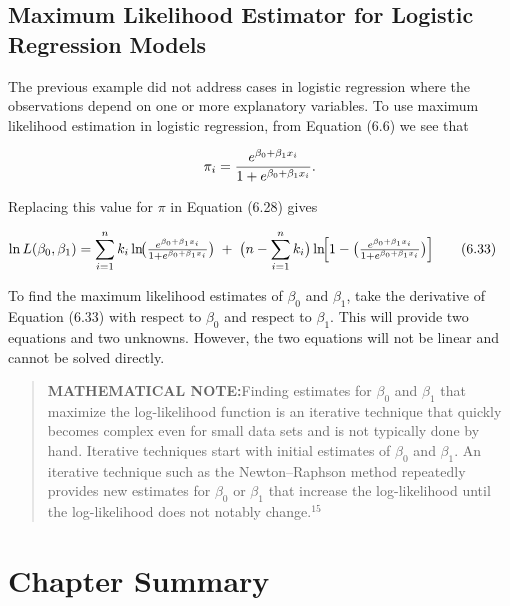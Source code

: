 \documentclass[
]{book}
\begin{document}
\hypertarget{maximum-likelihood-estimator-for-logistic-regression-models}{%
\subsection*{Maximum Likelihood Estimator for Logistic Regression Models}\label{maximum-likelihood-estimator-for-logistic-regression-models}}

The previous example did not address cases in logistic regression where the observations depend on one or more explanatory variables. To use maximum likelihood estimation in logistic regression, from Equation (6.6) we see that

\[
\pi_i = \frac{e^{\beta_0 + \beta_1 x_i}}{1 + e^{\beta_0 + \beta_1 x_i}}.
\notag
\]

Replacing this value for \(\pi\) in Equation (6.28) gives

\begin{align}
\ln L(\beta_0, \beta_1)
&= \sum_{i=1}^n k_i \ln\!\bigl(\tfrac{e^{\beta_0 + \beta_1 x_i}}{1 + e^{\beta_0 + \beta_1 x_i}}\bigr)
\;+\;\bigl(n - \sum_{i=1}^n k_i\bigr)\ln\!\Bigl[1 - \bigl(\tfrac{e^{\beta_0 + \beta_1 x_i}}{1 + e^{\beta_0 + \beta_1 x_i}}\bigr)\Bigr]
\tag{6.33}
\end{align}

To find the maximum likelihood estimates of \(\beta_0\) and \(\beta_1\), take the derivative of Equation (6.33) with respect to \(\beta_0\) and respect to \(\beta_1\). This will provide two equations and two unknowns. However, the two equations will not be linear and cannot be solved directly.

\begin{quote}
\textbf{MATHEMATICAL NOTE:}Finding estimates for \(\beta_0\) and \(\beta_1\) that maximize the log-likelihood function is an iterative technique that quickly becomes complex even for small data sets and is not typically done by hand. Iterative techniques start with initial estimates of \(\beta_0\) and \(\beta_1\). An iterative technique such as the Newton--Raphson method repeatedly provides new estimates for \(\beta_0\) or \(\beta_1\) that increase the log-likelihood until the log-likelihood does not notably change.\(^{15}\)
\end{quote}

\hypertarget{chapter-summary-5}{%
\section{Chapter Summary}\label{chapter-summary-5}}
\end{document}
